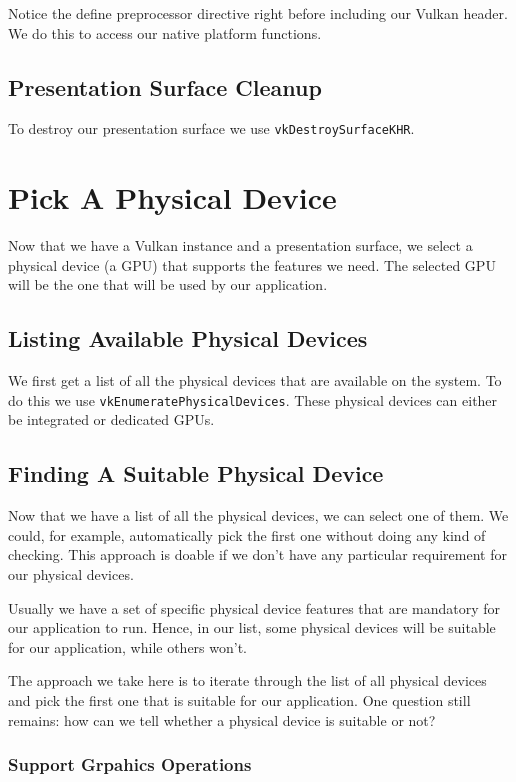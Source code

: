 Notice the define preprocessor directive right before including our Vulkan header.
We do this to access our native platform functions.

\subsection{Presentation Surface Cleanup}

To destroy our presentation surface we use \texttt{vkDestroySurfaceKHR}.

\section{Pick A Physical Device}

Now that we have a Vulkan instance and a presentation surface, we select
a physical device (a GPU) that supports the features we need.
The selected GPU will be the one that will be used by our application.

\subsection{Listing Available Physical Devices}

We first get a list of all the physical devices that are available on the
system.
To do this we use \texttt{vkEnumeratePhysicalDevices}.
These physical devices can either be integrated or dedicated GPUs.

\subsection{Finding A Suitable Physical Device}

Now that we have a list of all the physical devices, we can select one of them.
We could, for example, automatically pick the first one without doing any kind
of checking.
This approach is doable if we don't have any particular requirement for our
physical devices.

Usually we have a set of specific physical device features that are mandatory
for our application to run.
Hence, in our list, some physical devices will be suitable for our application, while
others won't.

The approach we take here is to iterate through the list of all physical devices and
pick the first one that is suitable for our application.
One question still remains: how can we tell whether a physical device is suitable or not?

\subsubsection{Support Grpahics Operations}

